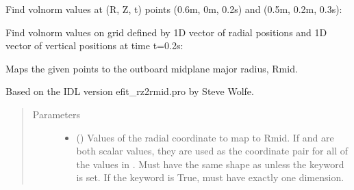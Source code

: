 \documentclass[letterpaper,10pt,english]{sphinxmanual}
\begin{document}
\begin{fulllineitems}
\begin{fulllineitems}
Find volnorm values at (R, Z, t) points (0.6m, 0m, 0.2s) and (0.5m, 0.2m, 0.3s):

\begin{sphinxVerbatim}[commandchars=\\\{\}]
  \PYG{p}{[} \PYG{p}{]} \PYG{p}{[} \PYG{p}{]} \PYG{p}{[} \PYG{p}{]} 
\end{sphinxVerbatim}

Find volnorm values on grid defined by 1D vector of radial positions 
and 1D vector of vertical positions  at time t=0.2s:

\begin{sphinxVerbatim}[commandchars=\\\{\}]
     
\end{sphinxVerbatim}

\end{fulllineitems}


\begin{fulllineitems}
\label{\detokenize{eqtools:eqtools.core.Equilibrium.rz2rmid}}
Maps the given points to the outboard midplane major radius, Rmid.

Based on the IDL version efit\_rz2rmid.pro by Steve Wolfe.
\begin{quote}\begin{description}
\item[{Parameters}] \leavevmode\begin{itemize}
\item {} 
 () \textendash{} Values of the radial coordinate to
map to Rmid. If  and  are both scalar values,
they are used as the coordinate pair for all of the values in
. Must have the same shape as  unless the 
keyword is set. If the  keyword is True,  must
have exactly one dimension.


\end{itemize}
\end{description}
\end{quote}
\end{fulllineitems}
\end{fulllineitems}
\end{document}
